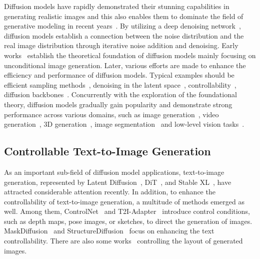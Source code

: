 \documentclass{article} %
\begin{document}
Diffusion models have rapidly demonstrated their stunning capabilities in generating realistic images and this also enables them to dominate the field of generative modeling in recent years~\citep{rombach2022high, saharia2022photorealistic, ho2020denoising, ramesh2022hierarchical, Peebles2022DiT}. 
%
By utilizing a deep denoising network~\citep{ronneberger2015u}, diffusion models establish a connection between the noise distribution and the real image distribution through iterative noise addition and denoising.
%
Early works~\citep{ho2020denoising, Song2021score, sohl2015deep} establish the theoretical foundation of diffusion models mainly focusing on unconditional image generation. 
%
Later, various efforts are made to enhance the efficiency and performance of diffusion models.
%
Typical examples should be efficient sampling methods~\citep{song2020denoising,zhang2022fast, lu2022dpm}, denoising in the latent space~\citep{rombach2022high}, controllability~\citep{feng2022training, zhou2023maskdiffusion}, diffusion backbones~\citep{ramesh2022hierarchical,Peebles2022DiT}.
%
Concurrently with the exploration of the foundational theory, diffusion models gradually gain popularity and demonstrate strong performance across various domains, such as image generation~\citep{zhou2023maskdiffusion}, video generation~\citep{zhou2023magicvideo}, 3D generation~\citep{Zeng2022lion,Zhou2021shape3d}, image segmentation~\citep{li2023open, amit2021segdiff} and low-level vision tasks~\citep{wang2023exploiting, Lugmayr_2022_CVPR, xie2022smartbrush,saharia2021image}.



\subsection{Controllable Text-to-Image Generation}

As an important sub-field of diffusion model applications, text-to-image generation, represented by Latent Diffusion~\citep{rombach2022high}, DiT~\citep{Peebles2022DiT}, and Stable XL~\citep{podell2023sdxl}, have attracted considerable attention recently.
In addition, to enhance the controllability of text-to-image generation, a multitude of methods emerged as well.
%
%
Among them, ControlNet~\citep{zhang2023adding} and T2I-Adapter~\citep{mou2023t2i} introduce control conditions, such as depth maps, pose images, or sketches, to direct the generation of images.
%
MaskDiffusion~\citep{zhou2023maskdiffusion} and StructureDiffusion~\citep{feng2023trainingfree} focus on enhancing the text controllability.
%
There are also some works~\citep{mao2023training,ma2023directed} controlling the layout of generated images.
\end{document}
